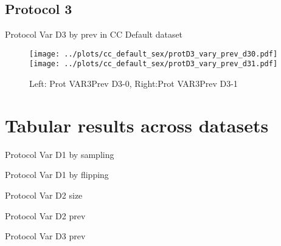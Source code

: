\documentclass[10pt,a4paper]{article}
\begin{document}
\clearpage
\newpage
\subsection{Protocol 3}

\begin{table}[h!]
\small

\caption{Protocol Var D3 by prev in CC Default dataset}
\end{table}

\begin{figure}[h!]
\texttt{[image: ../plots/cc\_default\_sex/protD3\_vary\_prev\_d30.pdf]}
\texttt{[image: ../plots/cc\_default\_sex/protD3\_vary\_prev\_d31.pdf]}
\caption{Left: Prot VAR3Prev D3-0, Right:Prot VAR3Prev D3-1}
\end{figure}


\section{Tabular results across datasets}
\begin{table}[h!]
\small

\caption{Protocol Var D1 by sampling}
\end{table}


\begin{table}[h!]
\small

\caption{Protocol Var D1 by flipping}
\end{table}

\begin{table}[h!]
\small

\caption{Protocol Var D2 size}
\end{table}

\begin{table}[h!]
\small

\caption{Protocol Var D2 prev}
\end{table}

\begin{table}[h!]
\small

\caption{Protocol Var D3 prev}
\end{table}
\end{document}
